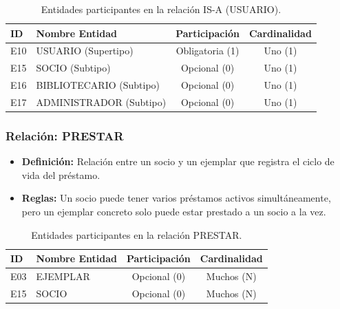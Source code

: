 \begin{table}[H]
	\centering
	\caption{Entidades participantes en la relación IS-A (USUARIO).}
	\label{tab:rel_isa_usuario}
	\small
	\begin{tabularx}{\textwidth}{X l c c}
		\toprule
		\textbf{ID} & \textbf{Nombre Entidad} & \textbf{Participación} & \textbf{Cardinalidad} \\
		\midrule
		E10 & USUARIO (Supertipo) & Obligatoria (1) & Uno (1) \\
		\addlinespace
		E15 & SOCIO (Subtipo) & Opcional (0) & Uno (1) \\
		\addlinespace
		E16 & BIBLIOTECARIO (Subtipo) & Opcional (0) & Uno (1) \\
		\addlinespace
		E17 & ADMINISTRADOR (Subtipo) & Opcional (0) & Uno (1) \\
		\bottomrule
	\end{tabularx}
\end{table}

\subsubsection{Relación: PRESTAR}
\begin{itemize}
	\item\textbf{Definición:} Relación entre un socio y un ejemplar que registra el ciclo de vida del préstamo.
	\item\textbf{Reglas:} Un socio puede tener varios préstamos activos simultáneamente, pero un ejemplar concreto solo puede estar prestado a un socio a la vez.
\end{itemize}

\begin{table}[H]
	\centering
	\caption{Entidades participantes en la relación PRESTAR.}
	\label{tab:rel_prestar}
	\small
	\begin{tabularx}{\textwidth}{X l c c}
		\toprule
		\textbf{ID} & \textbf{Nombre Entidad} & \textbf{Participación} & \textbf{Cardinalidad} \\
		\midrule
		E03 & EJEMPLAR & Opcional (0) & Muchos (N) \\
		\addlinespace
		E15 & SOCIO & Opcional (0) & Muchos (N) \\
		\bottomrule
	\end{tabularx}
\end{table}

